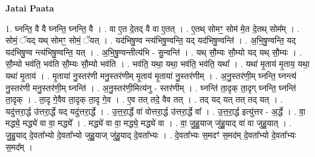 \documentclass[17pt]{extarticle}
\begin{document}
\textbf{Jatai Paata} \newline

1. घ्नन्ति॒ वै वै घ्नन्ति॒ घ्नन्ति॒ वै । . वा ए॒त दे॒तद् वै वा ए॒तत् । . ए॒तथ् सोमꣳ॒॒ सोम॑ मे॒त दे॒तथ् सोम᳚म् । . सोमं॒ ॅयद् यथ् सोमꣳ॒॒ सोमं॒ ॅयत् । . यद॑भिषु॒ण्व न्त्य॑भिषु॒ण्वन्ति॒ यद् यद॑भिषु॒ण्वन्ति॑ । . अ॒भि॒षु॒ण्वन्ति॒ यद् यद॑भिषु॒ण्व न्त्य॑भिषु॒ण्वन्ति॒ यत् । . अ॒भि॒षु॒ण्वन्तीत्य॑भि - सु॒न्वन्ति॑ । . यथ् सौ॒म्यः सौ॒म्यो यद् यथ् सौ॒म्यः । . सौ॒म्यो भव॑ति॒ भव॑ति सौ॒म्यः सौ॒म्यो भव॑ति । . भव॑ति॒ यथा॒ यथा॒ भव॑ति॒ भव॑ति॒ यथा᳚ । . यथा॑ मृ॒ताय॑ मृ॒ताय॒ यथा॒ यथा॑ मृ॒ताय॑ । . मृ॒ताया॑ नु॒स्तर॑णी मनु॒स्तर॑णीम् मृ॒ताय॑ मृ॒ताया॑ नु॒स्तर॑णीम् । . अ॒नु॒स्तर॑णी॒म् घ्नन्ति॒ घ्नन्त्य॑ नु॒स्तर॑णी मनु॒स्तर॑णी॒म् घ्नन्ति॑ । . अ॒नु॒स्तर॑णी॒मित्य॑नु - स्तर॑णीम् । . घ्नन्ति॑ ता॒दृक् ता॒दृग् घ्नन्ति॒ घ्नन्ति॑ ता॒दृक् । . ता॒दृ गे॒वैव ता॒दृक् ता॒दृ गे॒व । . ए॒व तत् तदे॒ वैव तत् । . तद् यद् यत् तत् तद् यत् । . यदु॑त्तरा॒र्द्ध उ॑त्तरा॒र्द्धे यद् यदु॑त्तरा॒र्द्धे । . उ॒त्त॒रा॒र्द्धे वा॑ वोत्तरा॒र्द्ध उ॑त्तरा॒र्द्धे वा᳚ । . उ॒त्त॒रा॒र्द्ध इत्यु॑त्तर - अ॒र्द्धे । . वा॒ मद्ध्ये॒ मद्ध्ये॑ वा वा॒ मद्ध्ये᳚ । . मद्ध्ये॑ वा वा॒ मद्ध्ये॒ मद्ध्ये॑ वा । . वा॒ जु॒हु॒याज् जु॑हु॒याद् वा॑ वा जुहु॒यात् । . जु॒हु॒याद् दे॒वता᳚भ्यो दे॒वता᳚भ्यो जुहु॒याज् जु॑हु॒याद् दे॒वता᳚भ्यः । . दे॒वता᳚भ्यः स॒मदꣳ॑ स॒मद॑म् दे॒वता᳚भ्यो दे॒वता᳚भ्यः स॒मद᳚म् । \newline
\end{document}
